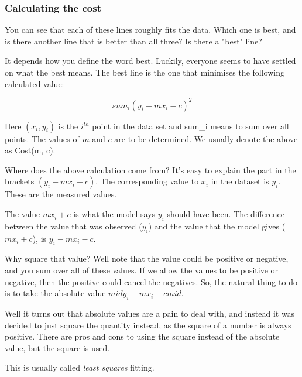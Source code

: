 \documentclass[11pt]{article}
\begin{document}
    \subsubsection{Calculating the cost}\label{calculating-the-cost}

You can see that each of these lines roughly fits the data. Which one is
best, and is there another line that is better than all three? Is there
a "best" line?

It depends how you define the word best. Luckily, everyone seems to have
settled on what the best means. The best line is the one that minimises
the following calculated value:

\[ sum_i (y_i - mx_i - c)^2 \]

Here \((x_i, y_i)\) is the \(i^{th}\) point in the data set and sum\_i
means to sum over all points. The values of \(m\) and \(c\) are to be
determined. We usually denote the above as Cost(m, c).

Where does the above calculation come from? It's easy to explain the
part in the brackets \((y_i - mx_i - c)\). The corresponding value to
\(x_i\) in the dataset is \(y_i\). These are the measured values.

The value \(m x_i + c\) is what the model says \(y_i\) should have been.
The difference between the value that was observed (\(y_i\)) and the
value that the model gives (\(m x_i + c\)), is \(y_i - mx_i - c\).

Why square that value? Well note that the value could be positive or
negative, and you sum over all of these values. If we allow the values
to be positive or negative, then the positive could cancel the
negatives. So, the natural thing to do is to take the absolute value
\(mid y_i - m x_i - c mid\).

Well it turns out that absolute values are a pain to deal with, and
instead it was decided to just square the quantity instead, as the
square of a number is always positive. There are pros and cons to using
the square instead of the absolute value, but the square is used.

This is usually called \emph{least squares} fitting.
\end{document}
